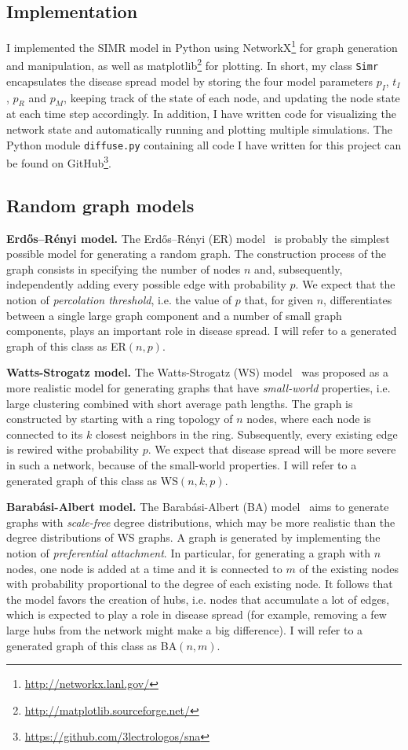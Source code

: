 \documentclass[11pt]{article} %
\begin{document}
\subsection{Implementation}
I implemented the SIMR model in Python using
NetworkX\footnote{\url{http://networkx.lanl.gov/}} for graph
generation and manipulation, as well as
matplotlib\footnote{\url{http://matplotlib.sourceforge.net/}} for plotting.
In short, my class \texttt{Simr} encapsulates the
disease spread model by storing the four model parameters $p_I$, $t_I$, $p_R$
and $p_M$, keeping track of the state of each node, and updating the node state
at each time step accordingly. In addition, I have
written code for visualizing the network state and automatically running
and plotting multiple simulations. The Python module \texttt{diffuse.py}
containing all code I have written for this project can be found on
GitHub\footnote{\url{https://github.com/3lectrologos/sna}}.

\subsection{Random graph models}
\noindent\textbf{Erdős–Rényi model.} The Erdős–Rényi (ER) model~\cite{erdos} is
probably the simplest possible model for generating a random graph. The
construction process of the graph consists in specifying the number of
nodes $n$ and, subsequently, independently adding every possible edge
with probability $p$. We expect that the notion of \emph{percolation
threshold}, i.e. the value of $p$ that, for given $n$, differentiates
between a single large graph component and a number of small graph
components, plays an important role in disease spread. I will refer to a
generated graph of this class as ER$(n, p)$.

\noindent\textbf{Watts-Strogatz model.} The Watts-Strogatz (WS)
model~\cite{watts} was proposed as a more realistic model for generating graphs
that have \emph{small-world} properties, i.e. large clustering combined with
short average path lengths. The graph is constructed by starting with a ring
topology of $n$ nodes, where each node is connected to its $k$ closest neighbors
in the ring. Subsequently, every existing edge is rewired withe probability $p$.
We expect that disease spread will be more severe in such a network, because
of the small-world properties. I will refer to a generated graph of this class
as WS$(n, k, p)$.

\noindent\textbf{Barabási-Albert model.} The Barabási-Albert (BA)
model~\cite{barabasi} aims to generate graphs with \emph{scale-free} degree
distributions, which may be more realistic than the degree distributions of
WS graphs. A graph is generated by implementing the notion of
\emph{preferential attachment}. In particular, for generating a graph with
$n$ nodes, one node is added at a time and it is connected to $m$ of the
existing nodes with probability proportional to the degree of each existing
node. It follows that the model favors the creation of hubs, i.e. nodes that
accumulate a lot of edges, which is expected to play a role in disease spread
(for example, removing a few large hubs from the network might make a big
difference). I will refer to a generated graph of this class
as BA$(n, m)$.
\end{document}
